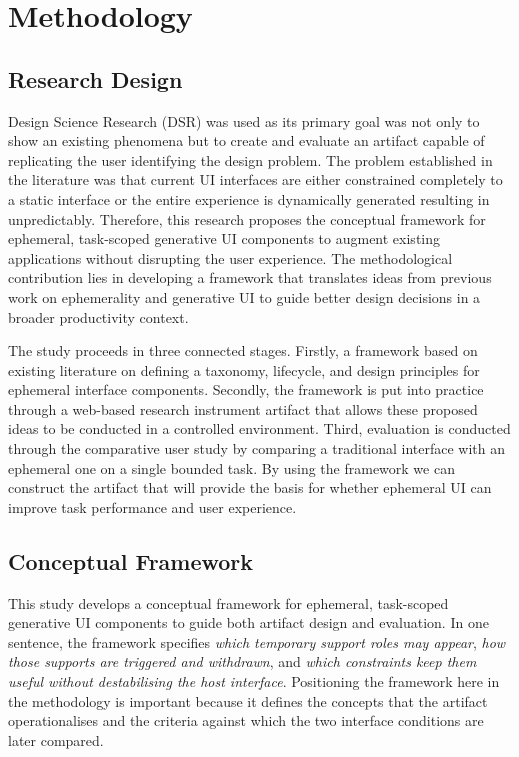 \pagestyle{fancy}
\section{Methodology}

\subsection{Research Design}
Design Science Research (DSR) \parencite{Delport2024DSR} was used as its primary goal was not only to show an existing phenomena but to create and evaluate an artifact capable of replicating the user identifying the design problem. The problem established in the literature was that current UI interfaces are either constrained completely to a static interface or the entire experience is dynamically generated resulting in unpredictably. Therefore, this research proposes the conceptual framework for ephemeral, task-scoped generative UI components to augment existing applications without disrupting the user experience. The methodological contribution lies in developing a framework that translates ideas from previous work on ephemerality and generative UI to guide better design decisions in a broader productivity context.

The study proceeds in three connected stages. Firstly, a framework based on existing literature on defining a taxonomy, lifecycle, and design principles for ephemeral interface components. Secondly, the framework is put into practice through a web-based research instrument artifact that allows these proposed ideas to be conducted in a controlled environment. Third, evaluation is conducted through the comparative user study by comparing a traditional interface with an ephemeral one on a single bounded task. By using the framework we can construct the artifact that will provide the basis for whether ephemeral UI can improve task performance and user experience.

\subsection{Conceptual Framework}
This study develops a conceptual framework for ephemeral, task-scoped generative UI components to guide both artifact design and evaluation. In one sentence, the framework specifies \emph{which temporary support roles may appear}, \emph{how those supports are triggered and withdrawn}, and \emph{which constraints keep them useful without destabilising the host interface}. Positioning the framework here in the methodology is important because it defines the concepts that the artifact operationalises and the criteria against which the two interface conditions are later compared.

